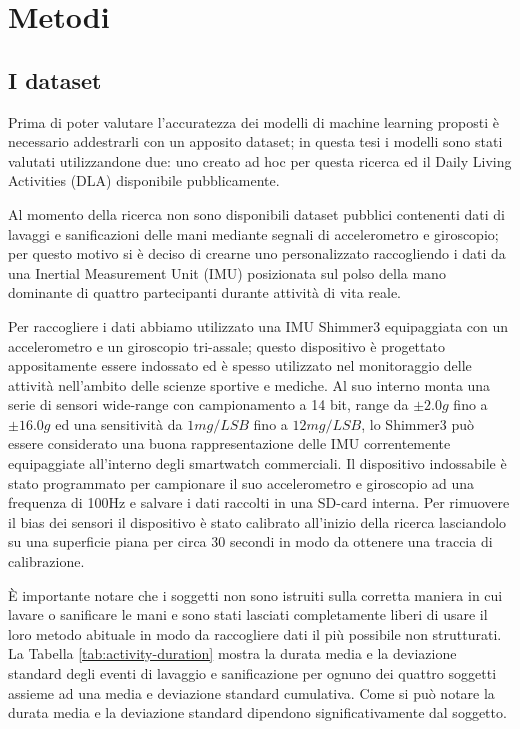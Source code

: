 \chapter{Metodi}
\label{cap:metodo}

\section{I dataset}
\label{sec:dataset}

Prima di poter valutare l'accuratezza dei modelli di machine learning proposti è necessario addestrarli con un apposito dataset; in questa tesi i modelli sono stati valutati utilizzandone due: uno creato ad hoc per questa ricerca ed il Daily Living Activities (DLA) disponibile pubblicamente\cite{leotta2021daily}.

Al momento della ricerca non sono disponibili dataset pubblici contenenti dati di lavaggi e sanificazioni delle mani mediante segnali di accelerometro e giroscopio; per questo motivo si è deciso di crearne uno personalizzato raccogliendo i dati da una Inertial Measurement Unit (IMU) posizionata sul polso della mano dominante di quattro partecipanti durante attività di vita reale.

Per raccogliere i dati abbiamo utilizzato una IMU Shimmer3 equipaggiata con un accelerometro e un giroscopio tri-assale\cite{shimmer}; questo dispositivo è progettato appositamente essere indossato ed è spesso utilizzato nel monitoraggio delle attività nell'ambito delle scienze sportive e mediche. Al suo interno monta una serie di sensori wide-range con campionamento a 14 bit, range da $\pm2.0g$ fino a $\pm16.0g$ ed una sensitività da $1mg/LSB$ fino a $12mg/LSB$, lo Shimmer3 può essere considerato una buona rappresentazione delle IMU correntemente equipaggiate all'interno degli smartwatch commerciali. Il dispositivo indossabile è stato programmato per campionare il suo accelerometro e giroscopio ad una frequenza di 100Hz e salvare i dati raccolti in una SD-card interna. Per rimuovere il bias dei sensori il dispositivo è stato calibrato all'inizio della ricerca lasciandolo su una superficie piana per circa 30 secondi in modo da ottenere una traccia di calibrazione.

\`E importante notare che i soggetti non sono istruiti sulla corretta maniera in cui lavare o sanificare le mani e sono stati lasciati completamente liberi di usare il loro metodo abituale in modo da raccogliere dati il più possibile non strutturati. La Tabella \ref{tab:activity-duration} mostra la durata media e la deviazione standard degli eventi di lavaggio e sanificazione per ognuno dei quattro soggetti assieme ad una media e deviazione standard cumulativa. Come si può notare la durata media e la deviazione standard dipendono significativamente dal soggetto.

